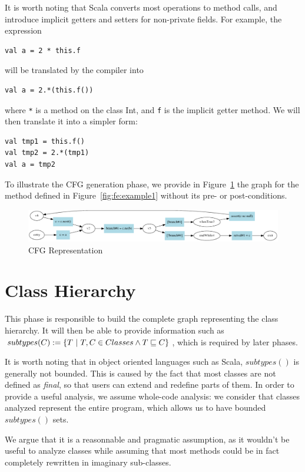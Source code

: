 It is worth noting that Scala converts most operations to method calls, and
introduce implicit getters and setters for non-private fields. For example,
the expression 
\begin{lstlisting}
val a = 2 * this.f
\end{lstlisting}
will be translated by the compiler into 
\begin{lstlisting}
val a = 2.*(this.f())
\end{lstlisting}
where \verb/*/ is a method on the class Int, and \verb/f/ is the implicit
getter method. We will then translate it into a simpler form:
\begin{lstlisting}
val tmp1 = this.f()
val tmp2 = 2.*(tmp1)
val a = tmp2
\end{lstlisting}


To illustrate the CFG generation phase, we provide in
Figure~\ref{fig:cfg:example1} the graph for the method defined in
Figure~\ref{fig:fe:example1} without its pre- or post-conditions.

\begin{figure}[h]
    \centering

    \includegraphics[scale=0.40]{images/cfg_example1}

    \caption{CFG Representation}
    \label{fig:cfg:example1}
\end{figure}

\section{Class Hierarchy}
This phase is responsible to build the complete graph representing the class
hierarchy. It will then be able to provide information such as $subtypes(C)
:= \{ T ~|~ T,C \in Classes \land T \sqsubseteq C \}$, which is required by later phases.

It is worth noting that in object oriented languages such as Scala,
$subtypes()$ is generally not bounded. This is caused by the fact that most
classes are not defined as \emph{final}, so that users can extend and redefine
parts of them. In order to provide a useful analysis, we assume
whole-code analysis: we consider that classes analyzed represent the entire
program, which allows us to have bounded $subtypes()$ sets.

We argue that it is a reasonnable and pragmatic assumption, as it wouldn't be
useful to analyze classes while assuming that most methods could be in fact
completely rewritten in imaginary sub-classes.
